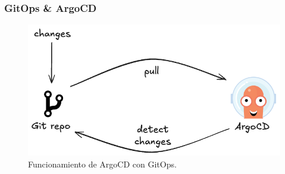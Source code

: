 \documentclass{beamer}
\begin{document}
\begin{frame}
\begin{columns}
\begin{column}{0.5\textwidth}
\begin{figure}
            \end{figure}
        \end{column}
    \end{columns}
\end{frame}

\begin{frame}
    \frametitle{GitOps \& ArgoCD}
    \begin{figure}
        \includegraphics[scale=0.35]{figuras/argocd-simple}
        \caption{Funcionamiento de ArgoCD con GitOps.}
    \end{figure}
\end{frame}

\end{document}
